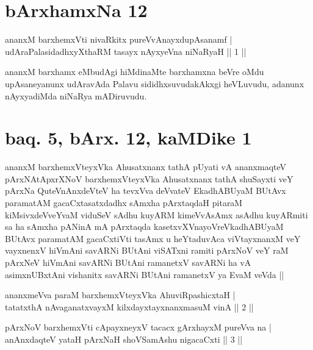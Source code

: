 
\section*{bArxhamxNa 12}


\begin{shl}
ananxM barxhemxVti nivaRkitx pureVvAnayxdupAsanamf | \\
udAraPalasidadhxyXthaRM tasayx nAyxyeVna niNaRyaH \hfill ||  1 || 
\end{shl}

\begin{artha}
ananxM barxhamx eMbudAgi hiMdinaMte barxhamxna beVre oMdu upAsaneyanunx udAravAda Palavu sididhxsuvudakAkxgi heVLuvudu, adanunx nAyxyadiMda niNaRya mADiruvudu.
\end{artha}

\section*{baq. 5, bArx. 12, kaMDike 1}

\begin{shl}
ananxM barxhemxVteyxVka Ahusatxnanx tathA pUyati vA ananxmaqteV pArxNAtApxrXNoV barxhemxVteyxVka Ahusatxnanx tathA shuSayxti veY pArxNa QuteV\s nAnxdeVteV ha tevxVva deVvateV EkadhABUyaM BUtAvx paramatAM gacaCxtasatxdadhx sAmxha pArxtaqdaH pitaraM kiMsivxdeVveYvaM viduSeV sAdhu kuyARM kimeVvAsAmx asAdhu kuyARmiti sa ha sAmxha pANinA mA pArxtaqda kasetxvXVnayoVreVkadhABUyaM BUtAvx paramatAM gacaCxtiVti tasAmx u heYtaduvAca viVtayxnanxM veY vayxnenxV hiVmAni savARNi BUtAni viSATxni ramiti pArxNoV veY raM pArxNeV hiVmAni savARNi BUtAni ramanetxV savARNi ha vA asimxnUBxtAni vishanitx savARNi BUtAni ramanetxV ya EvaM veVda ||
\end{shl}


\begin{shl}
ananxmeVva paraM barxhemxVteyxVka AhuviRpashicxtaH | \\
tatatxthA nAvaganatxvayxM kilxdayxtayxnanxmasuM vinA \hfill ||  2 ||
\end{shl}

\begin{shl}
pArxNoV barxhemxVti cApayxneyxV tacacx gArxhayxM pureVva na | \\
anAnxdaqteV yataH pArxNaH shoVSamAshu nigacaCxti \hfill ||  3 || 
\end{shl}

